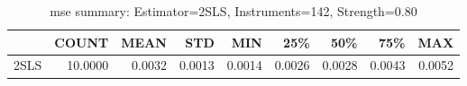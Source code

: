 \begin{table}[ht]
\centering
\caption{mse summary: Estimator=2SLS, Instruments=142, Strength=0.80}
\begin{tabular}{lrrrrrrrr}
\toprule
 & COUNT & MEAN & STD & MIN & 25\% & 50\% & 75\% & MAX \\
\midrule
2SLS & 10.0000 & 0.0032 & 0.0013 & 0.0014 & 0.0026 & 0.0028 & 0.0043 & 0.0052 \\
\bottomrule
\end{tabular}
\end{table}
